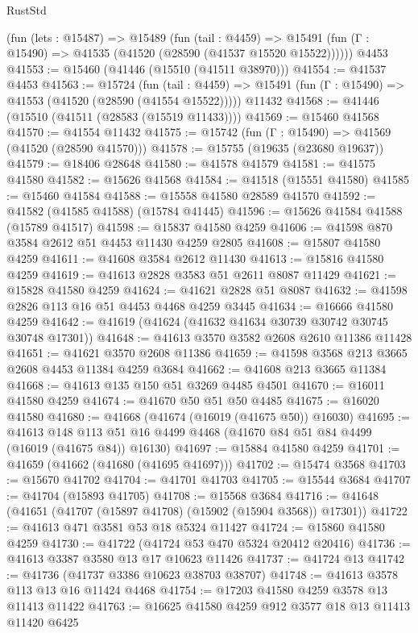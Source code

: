 \begin{lexlean}{RustStd}
\begin{coremodule}
    (fun (lets : @15487) =>
    @15489
      (fun (tail : @4459) =>
      @15491 (fun (Γ : @15490) => @41535 (@41520 (@28590 (@41537 @15520 @15522))))))
    @4453
@41553 := @15460 (@41446 (@15510 (@41511 @38970)))
@41554 := @41537 @4453
@41563 := @15724
    (fun (tail : @4459) => @15491 (fun (Γ : @15490) => @41553 (@41520 (@28590 (@41554 @15522)))))
    @11432
@41568 := @41446 (@15510 (@41511 (@28583 (@15519 @11433))))
@41569 := @15460 @41568
@41570 := @41554 @11432
@41575 := @15742 (fun (Γ : @15490) => @41569 (@41520 (@28590 @41570)))
@41578 := @15755 (@19635 (@23680 @19637))
@41579 := @18406 @28648
@41580 := @41578 @41579
@41581 := @41575 @41580
@41582 := @15626 @41568
@41584 := @41518 (@15551 @41580)
@41585 := @15460 @41584
@41588 := @15558 @41580 @28589 @41570
@41592 := @41582 (@41585 @41588) (@15784 @41445)
@41596 := @15626 @41584 @41588 (@15789 @41517)
@41598 := @15837 @41580 @4259
@41606 := @41598 @870 @3584 @2612 @51 @4453 @11430 @4259 @2805
@41608 := @15807 @41580 @4259
@41611 := @41608 @3584 @2612 @11430
@41613 := @15816 @41580 @4259
@41619 := @41613 @2828 @3583 @51 @2611 @8087 @11429
@41621 := @15828 @41580 @4259
@41624 := @41621 @2828 @51 @8087
@41632 := @41598 @2826 @113 @16 @51 @4453 @4468 @4259 @3445
@41634 := @16666 @41580 @4259
@41642 := @41619 (@41624 (@41632 @41634 @30739 @30742 @30745 @30748 @17301))
@41648 := @41613 @3570 @3582 @2608 @2610 @11386 @11428
@41651 := @41621 @3570 @2608 @11386
@41659 := @41598 @3568 @213 @3665 @2608 @4453 @11384 @4259 @3684
@41662 := @41608 @213 @3665 @11384
@41668 := @41613 @135 @150 @51 @3269 @4485 @4501
@41670 := @16011 @41580 @4259
@41674 := @41670 @50 @51 @50 @4485
@41675 := @16020 @41580
@41680 := @41668 (@41674 (@16019 (@41675 @50)) @16030)
@41695 := @41613
    @148
    @113
    @51
    @16
    @4499
    @4468
    (@41670 @84 @51 @84 @4499 (@16019 (@41675 @84)) @16130)
@41697 := @15884 @41580 @4259
@41701 := @41659 (@41662 (@41680 (@41695 @41697)))
@41702 := @15474 @3568
@41703 := @15670 @41702
@41704 := @41701 @41703
@41705 := @15544 @3684
@41707 := @41704 (@15893 @41705)
@41708 := @15568 @3684
@41716 := @41648 (@41651 (@41707 (@15897 @41708) (@15902 (@15904 @3568)) @17301))
@41722 := @41613 @471 @3581 @53 @18 @5324 @11427
@41724 := @15860 @41580 @4259
@41730 := @41722 (@41724 @53 @470 @5324 @20412 @20416)
@41736 := @41613 @3387 @3580 @13 @17 @10623 @11426
@41737 := @41724 @13
@41742 := @41736 (@41737 @3386 @10623 @38703 @38707)
@41748 := @41613 @3578 @113 @13 @16 @11424 @4468
@41754 := @17203 @41580 @4259 @3578 @13 @11413 @11422
@41763 := @16625 @41580 @4259 @912 @3577 @18 @13 @11413 @11420 @6425

\end{coremodule}
\end{lexlean}
